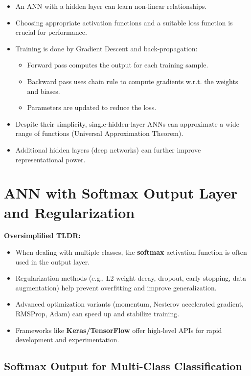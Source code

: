 \documentclass{article}
\begin{document}
\begin{itemize}
    \item An ANN with a hidden layer can learn non-linear relationships.
    \item Choosing appropriate activation functions and a suitable loss function is crucial for performance.
    \item Training is done by Gradient Descent and back-propagation:
    \begin{itemize}
        \item Forward pass computes the output for each training sample.
        \item Backward pass uses chain rule to compute gradients w.r.t. the weights and biases.
        \item Parameters are updated to reduce the loss.
    \end{itemize}
    \item Despite their simplicity, single-hidden-layer ANNs can approximate a wide range of functions (Universal Approximation Theorem).
    \item Additional hidden layers (deep networks) can further improve representational power.
\end{itemize}

\section{ANN with Softmax Output Layer and Regularization}

\textbf{Oversimplified TLDR:}
\begin{itemize}
    \item When dealing with multiple classes, the \textbf{softmax} activation function is often used in the output layer.
    \item Regularization methods (e.g., L2 weight decay, dropout, early stopping, data augmentation) help prevent overfitting and improve generalization.
    \item Advanced optimization variants (momentum, Nesterov accelerated gradient, RMSProp, Adam) can speed up and stabilize training.
    \item Frameworks like \textbf{Keras/TensorFlow} offer high-level APIs for rapid development and experimentation.
\end{itemize}

\subsection{Softmax Output for Multi-Class Classification}
\end{document}
